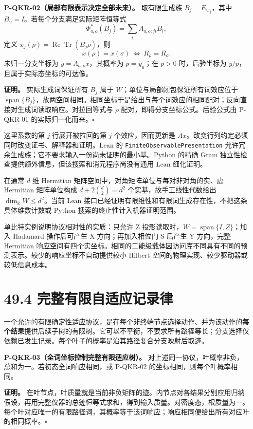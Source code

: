 \documentclass[
  11pt,
  oneside]{book}
\begin{document}
\textbf{P-QKR-02（局部有限表示决定全部未来）。} 取有限生成族
\(B_j=E_{w_j}\)，其中 \(B_u=I\)。若每个分支满足实际矩阵恒等式 \[
\Phi_{a,o}^*(B_j)=\sum_i A_{a,o;ji}B_i,
\] 定义 \(x_j(\rho)=\operatorname{Re}\operatorname{Tr}(B_j\rho)\)，则 \[
x(\rho)=x(\sigma)\ \Longleftrightarrow\ R_\rho=R_\sigma.
\] 未归一分支坐标为 \(y=A_{a,o}x\)，其概率为 \(p=y_u\)；在 \(p>0\)
时，后验坐标为 \(y/p\)，且属于实际态坐标的可达像。

\textbf{证明。} 实际生成词保证所有 \(B_j\) 属于
\(W\)；单位与局部闭包保证所有词效应位于
\(\operatorname{span}\{B_j\}\)，故两空间相同。相同坐标于是给出与每个词效应的相同配对；反向直接对生成词读取响应。对拉回等式与
\(\rho\) 配对，即得分支坐标公式。后验公式由 P-QKR-01
的实际归一化而来。\(\square\)

这里系数的第 \(j\) 行展开被拉回的第 \(j\) 个效应，因而更新是
\(Ax\)。改变行列约定必须同时改变证书、解释器和证明。Lean 的
\texttt{Finite\allowbreak Observable\allowbreak Presentation}
允许冗余生成族；它不要求输入一份尚未证明的最小基。Python 的精确 Gram
独立性检查提供额外信息，但该搜索和消元程序尚没有通用 Lean 细化证明。

在通常 \(d\) 维 Hermitian 矩阵空间中，对角矩阵单位与每对非对角的实、虚
Hermitian 矩阵单位构成 \(d+2\binom d2=d^2\) 个实基，故手工线性代数给出
\(\dim_{\mathbb R}W\le d^2\)。当前 Lean
接口已经证明有限维性和有限词生成存在性，不把这条具体维数计数或 Python
搜索的终止性计入机器证明范围。

单比特实例说明协议相对性的实质：只允许 Z
投影读取时，\(W=\operatorname{span}\{I,Z\}\)；加入 Hadamard 操作后可产生
X 方向；再加入相位门 S 后产生 Y 方向，完整 Hermitian
响应空间有四个实坐标。相同的二能级载体因访问库不同具有不同的预测表示。较少的响应坐标不自动提供较小
Hilbert 空间的物理实现、较少驱动器或较低信息成本。

\section{49.4 完整有限自适应记录律}

一个允许的有限确定性适应协议，是在每个非终端节点选择动作、并为该动作的\textbf{每个结果}提供后续子树的有限树。它可以不平衡，不要求所有路径等长；分支选择仅依赖已发生记录。每个叶子的概率是沿其路径复合分支映射后取迹。

\protect\hypertarget{p-qkr-03}{}{}

\textbf{P-QKR-03（全词坐标控制完整有限适应树）。}
对上述同一协议，叶概率非负，总和为一。若初态全词响应相同，或 P-QKR-02
的坐标相同，则每个叶概率相同。

\textbf{证明。}
在叶节点，叶质量就是当前非负矩阵的迹。内节点对各结果分别应用归纳假设，再用完整仪器的总迹恒等式求和，得到输入质量。对密度态，根质量为一。每个叶对应唯一的有限路径词，其概率等于该词响应；响应相同便给出所有对应叶的相同概率。\(\square\)
\end{document}
